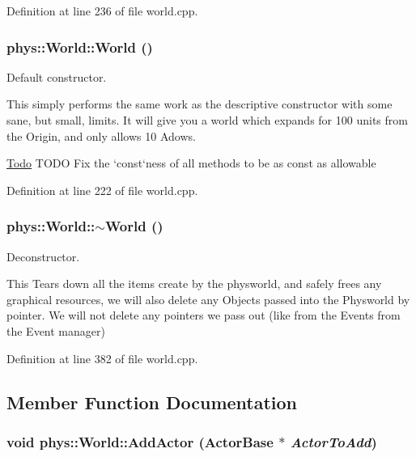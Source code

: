 Definition at line 236 of file world.cpp.

\hypertarget{classphys_1_1World_a7f762724406c874250c3dc8910a1e695}{
\subsubsection[{World}]{\setlength{\rightskip}{0pt plus 5cm}phys::World::World ()}}
\label{da/ddf/classphys_1_1World_a7f762724406c874250c3dc8910a1e695}


Default constructor. 

This simply performs the same work as the descriptive constructor with some sane, but small, limits. It will give you a world which expands for 100 units from the Origin, and only allows 10 Adows.

\begin{Desc}
\item[\hyperlink{todo__todo000014}{Todo}]TODO Fix the `const`ness of all methods to be as const as allowable \end{Desc}


Definition at line 222 of file world.cpp.

\hypertarget{classphys_1_1World_a8b2c74c7e5d5ce3c46a814e183a7aff1}{
\subsubsection[{$\sim$World}]{\setlength{\rightskip}{0pt plus 5cm}phys::World::$\sim$World ()}}
\label{da/ddf/classphys_1_1World_a8b2c74c7e5d5ce3c46a814e183a7aff1}


Deconstructor. 

This Tears down all the items create by the physworld, and safely frees any graphical resources, we will also delete any Objects passed into the Physworld by pointer. We will not delete any pointers we pass out (like from the Events from the Event manager) 

Definition at line 382 of file world.cpp.



\subsection{Member Function Documentation}
\hypertarget{classphys_1_1World_a0fec41ef68b7bb1443aab927f8277a81}{
\subsubsection[{AddActor}]{\setlength{\rightskip}{0pt plus 5cm}void phys::World::AddActor ({\bf ActorBase} $\ast$ {\em ActorToAdd})}}
\label{da/ddf/classphys_1_1World_a0fec41ef68b7bb1443aab927f8277a81}


